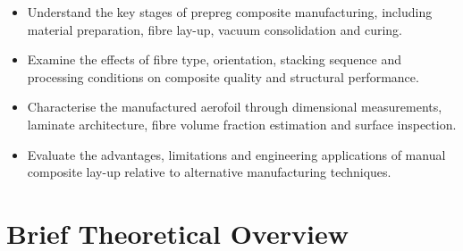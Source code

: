 \documentclass[11pt,a4paper]{article}
\begin{document}
\begin{itemize}[leftmargin=1.5em, itemsep=2pt, topsep=3pt]
    \item Understand the key stages of prepreg composite
    manufacturing, including material preparation, fibre
    lay-up, vacuum consolidation and curing.

    \item Examine the effects of fibre type, orientation,
    stacking sequence and processing conditions on
    composite quality and structural performance.

    \item Characterise the manufactured aerofoil through
    dimensional measurements, laminate architecture,
    fibre volume fraction estimation and surface inspection.

    \item Evaluate the advantages, limitations and
    engineering applications of manual composite lay-up
    relative to alternative manufacturing techniques.
\end{itemize}




    \section{Brief Theoretical Overview}
\end{document}
